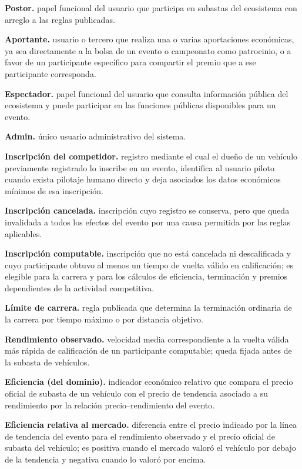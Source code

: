 \documentclass[10pt,letterpaper]{article}
\begin{document}
\noindent\textbf{Postor.} papel funcional del usuario que participa en subastas del ecosistema con arreglo a las reglas publicadas.\par
\noindent\textbf{Aportante.} usuario o tercero que realiza una o varias aportaciones económicas, ya sea directamente a la bolsa de un evento o campeonato como patrocinio, o a favor de un participante específico para compartir el premio que a ese participante corresponda.\par
\noindent\textbf{Espectador.} papel funcional del usuario que consulta información pública del ecosistema y puede participar en las funciones públicas disponibles para un evento.\par
\noindent\textbf{Admin.} único usuario administrativo del sistema.\par
\noindent\textbf{Inscripción del competidor.} registro mediante el cual el dueño de un vehículo previamente registrado lo inscribe en un evento, identifica al usuario piloto cuando exista pilotaje humano directo y deja asociados los datos económicos mínimos de esa inscripción.\par
\noindent\textbf{Inscripción cancelada.} inscripción cuyo registro se conserva, pero que queda invalidada a todos los efectos del evento por una causa permitida por las reglas aplicables.\par
\noindent\textbf{Inscripción computable.} inscripción que no está cancelada ni descalificada y cuyo participante obtuvo al menos un tiempo de vuelta válido en calificación; es elegible para la carrera y para los cálculos de eficiencia, terminación y premios dependientes de la actividad competitiva.\par
\noindent\textbf{Límite de carrera.} regla publicada que determina la terminación ordinaria de la carrera por tiempo máximo o por distancia objetivo.\par
\noindent\textbf{Rendimiento observado.} velocidad media correspondiente a la vuelta válida más rápida de calificación de un participante computable; queda fijada antes de la subasta de vehículos.\par
\noindent\textbf{Eficiencia (del dominio).} indicador económico relativo que compara el precio oficial de subasta de un vehículo con el precio de tendencia asociado a su rendimiento por la relación precio--rendimiento del evento.\par
\noindent\textbf{Eficiencia relativa al mercado.} diferencia entre el precio indicado por la línea de tendencia del evento para el rendimiento observado y el precio oficial de subasta del vehículo; es positiva cuando el mercado valoró el vehículo por debajo de la tendencia y negativa cuando lo valoró por encima.\par
\end{document}
